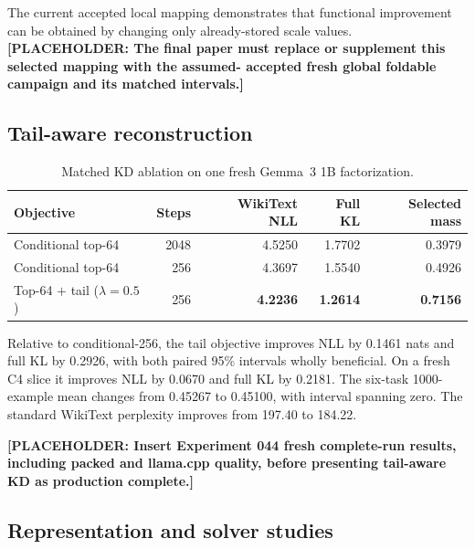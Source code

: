 \documentclass[10pt]{article}
\newcommand{\placeholder}[1]{\textcolor{red!70!black}{\textbf{[PLACEHOLDER: #1]}}}
\begin{document}
The current accepted local mapping demonstrates that functional improvement
can be obtained by changing only already-stored scale values. \placeholder{The
final paper must replace or supplement this selected mapping with the assumed-
accepted fresh global foldable campaign and its matched intervals.}

\subsection{Tail-aware reconstruction}

\begin{table}[t]
\centering
\caption{Matched KD ablation on one fresh Gemma~3 1B factorization.}
\label{tab:tail}
\begin{tabular}{lrrrr}
\toprule
Objective & Steps & WikiText NLL & Full KL & Selected mass \\
\midrule
Conditional top-64 & 2048 & 4.5250 & 1.7702 & 0.3979 \\
Conditional top-64 & 256  & 4.3697 & 1.5540 & 0.4926 \\
Top-64 $+$ tail ($\lambda=0.5$) & 256 & \textbf{4.2236} & \textbf{1.2614} & \textbf{0.7156} \\
\bottomrule
\end{tabular}
\end{table}

Relative to conditional-256, the tail objective improves NLL by 0.1461 nats
and full KL by 0.2926, with both paired 95\% intervals wholly beneficial. On a
fresh C4 slice it improves NLL by 0.0670 and full KL by 0.2181. The six-task
1000-example mean changes from 0.45267 to 0.45100, with interval spanning zero.
The standard WikiText perplexity improves from 197.40 to 184.22.

\placeholder{Insert Experiment 044 fresh complete-run results, including
packed and llama.cpp quality, before presenting tail-aware KD as production
complete.}

\subsection{Representation and solver studies}
\end{document}
